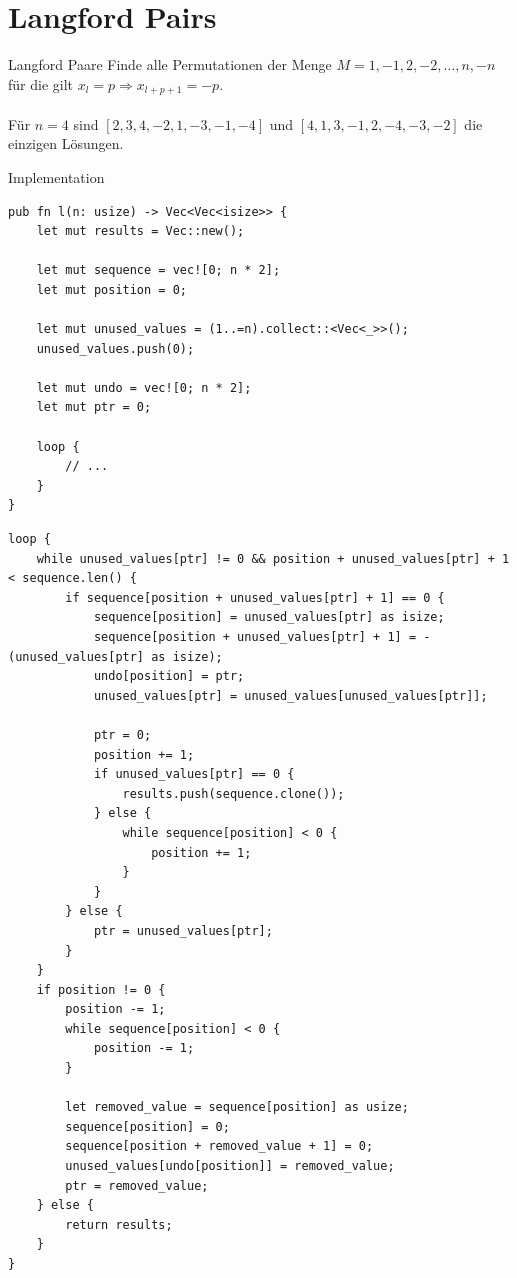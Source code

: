 \documentclass[aspectratio=43,t]{beamer}
\begin{document}
\section{Langford Pairs}
\begin{frame}{Langford Paare}
Finde alle Permutationen der Menge $M = {1, -1, 2, -2, \dots, n, -n}$ für die gilt $x_l = p \Rightarrow x_{l+p+1} = -p$.\\
\ \\
Für $n = 4$ sind $[2, 3, 4, -2, 1, -3, -1, -4]$ und $[4, 1, 3, -1, 2, -4, -3, -2]$ die einzigen Lösungen.
\end{frame}
\begin{frame}[fragile]{Implementation}
  \begin{verbatim}
pub fn l(n: usize) -> Vec<Vec<isize>> {
    let mut results = Vec::new();

    let mut sequence = vec![0; n * 2];
    let mut position = 0;

    let mut unused_values = (1..=n).collect::<Vec<_>>();
    unused_values.push(0);

    let mut undo = vec![0; n * 2];
    let mut ptr = 0;

    loop {
        // ...
    }
}
  \end{verbatim}
\end{frame}
\begin{frame}[fragile]
  \begin{verbatim}
loop {
    while unused_values[ptr] != 0 && position + unused_values[ptr] + 1 < sequence.len() {
        if sequence[position + unused_values[ptr] + 1] == 0 {
            sequence[position] = unused_values[ptr] as isize;
            sequence[position + unused_values[ptr] + 1] = -(unused_values[ptr] as isize);
            undo[position] = ptr;
            unused_values[ptr] = unused_values[unused_values[ptr]];

            ptr = 0;
            position += 1;
            if unused_values[ptr] == 0 {
                results.push(sequence.clone());
            } else {
                while sequence[position] < 0 {
                    position += 1;
                }
            }
        } else {
            ptr = unused_values[ptr];
        }
    }
    if position != 0 {
        position -= 1;
        while sequence[position] < 0 {
            position -= 1;
        }

        let removed_value = sequence[position] as usize;
        sequence[position] = 0;
        sequence[position + removed_value + 1] = 0;
        unused_values[undo[position]] = removed_value;
        ptr = removed_value;
    } else {
        return results;
    }
}
  \end{verbatim}
\end{frame}
\end{document}
